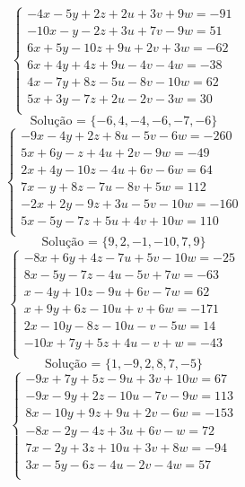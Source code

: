 \documentclass[12pt,oneside,a4paper]{article}
\begin{document}
\vspace{\baselineskip}
\begin{equation*}
\begin{cases}
-4x-5y+2z+2u+3v+9w=-91 \\
-10x-y-2z+3u+7v-9w=51 \\
6x+5y-10z+9u+2v+3w=-62 \\
6x+4y+4z+9u-4v-4w=-38 \\
4x-7y+8z-5u-8v-10w=62 \\
5x+3y-7z+2u-2v-3w=30 \\
\end{cases}
\end{equation*}
\begin{equation*}
\text{Solução = }\{-6,4,-4,-6,-7,-6\}
\end{equation*}
\vspace{\baselineskip}
\begin{equation*}
\begin{cases}
-9x-4y+2z+8u-5v-6w=-260 \\
5x+6y-z+4u+2v-9w=-49 \\
2x+4y-10z-4u+6v-6w=64 \\
7x-y+8z-7u-8v+5w=112 \\
-2x+2y-9z+3u-5v-10w=-160 \\
5x-5y-7z+5u+4v+10w=110 \\
\end{cases}
\end{equation*}
\begin{equation*}
\text{Solução = }\{9,2,-1,-10,7,9\}
\end{equation*}
\vspace{\baselineskip}
\begin{equation*}
\begin{cases}
-8x+6y+4z-7u+5v-10w=-25 \\
8x-5y-7z-4u-5v+7w=-63 \\
x-4y+10z-9u+6v-7w=62 \\
x+9y+6z-10u+v+6w=-171 \\
2x-10y-8z-10u-v-5w=14 \\
-10x+7y+5z+4u-v+w=-43 \\
\end{cases}
\end{equation*}
\begin{equation*}
\text{Solução = }\{1,-9,2,8,7,-5\}
\end{equation*}
\vspace{\baselineskip}
\begin{equation*}
\begin{cases}
-9x+7y+5z-9u+3v+10w=67 \\
-9x-9y+2z-10u-7v-9w=113 \\
8x-10y+9z+9u+2v-6w=-153 \\
-8x-2y-4z+3u+6v-w=72 \\
7x-2y+3z+10u+3v+8w=-94 \\
3x-5y-6z-4u-2v-4w=57 \\
\end{cases}
\end{equation*}
\end{document}
